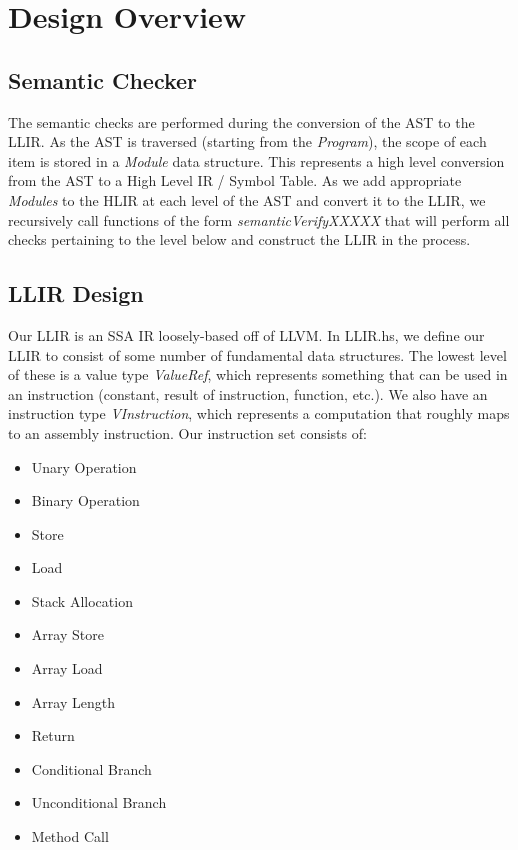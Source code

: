 \documentclass[11pt]{article}
\begin{document}
\section{Design Overview}

\subsection{Semantic Checker}

\par The semantic checks are performed during the conversion of the AST to the LLIR. As the AST is traversed (starting from the {\it Program}), the scope of each item is stored in a {\it Module} data structure. This represents a high level conversion from the AST to a High Level IR / Symbol Table. As we add appropriate {\it Modules} to the HLIR at each level of the AST and convert it to the LLIR, we recursively call functions of the form {\it semanticVerifyXXXXX} that will perform all checks pertaining to the level below and construct the LLIR in the process.

\subsection{LLIR Design}

\par Our LLIR is an SSA IR loosely-based off of LLVM. In LLIR.hs, we define our LLIR to consist of some number of fundamental data structures. The lowest level of these is a value type {\it ValueRef}, which represents something that can be used in an instruction (constant, result of instruction, function, etc.). We also have an instruction type {\it VInstruction}, which represents a computation that roughly maps to an assembly instruction. Our instruction set consists of:

\begin{itemize}
    \item Unary Operation
    \item Binary Operation
    \item Store
    \item Load
    \item Stack Allocation
    \item Array Store
    \item Array Load
    \item Array Length
    \item Return
    \item Conditional Branch
    \item Unconditional Branch
    \item Method Call
\end{itemize}
\end{document}
